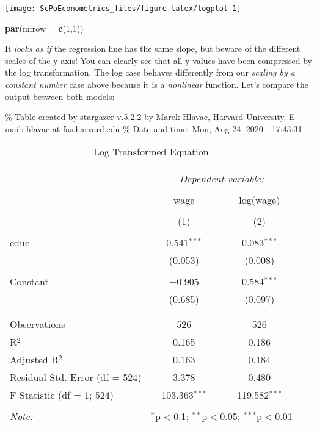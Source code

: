 \documentclass[]{book}
\newenvironment{Shaded}{\begin{snugshade}}{\end{snugshade}}
\newcommand{\DataTypeTok}[1]{\textcolor[rgb]{0.13,0.29,0.53}{#1}}
\newcommand{\DecValTok}[1]{\textcolor[rgb]{0.00,0.00,0.81}{#1}}
\newcommand{\KeywordTok}[1]{\textcolor[rgb]{0.13,0.29,0.53}{\textbf{#1}}}
\newcommand{\NormalTok}[1]{#1}
\begin{document}
\begin{center}\texttt{[image: ScPoEconometrics\_files/figure-latex/logplot-1]} \end{center}

\begin{Shaded}
\begin{Highlighting}[]
\KeywordTok{par}\NormalTok{(}\DataTypeTok{mfrow =} \KeywordTok{c}\NormalTok{(}\DecValTok{1}\NormalTok{,}\DecValTok{1}\NormalTok{))}
\end{Highlighting}
\end{Shaded}

It \emph{looks as if} the regression line has the same slope, but beware of the different scales of the y-axis! You can clearly see that all y-values have been compressed by the log transformation. The log case behaves differently from our \emph{scaling by a constant number} case above because it is a \emph{nonlinear} function. Let's compare the output between both models:

\% Table created by stargazer v.5.2.2 by Marek Hlavac, Harvard University. E-mail: hlavac at fas.harvard.edu
\% Date and time: Mon, Aug 24, 2020 - 17:43:31

\begin{table}[!htbp] \centering 
  \caption{Log Transformed Equation} 
  \label{} 
\begin{tabular}{@{\extracolsep{5pt}}lcc} 
\\[-1.8ex]\hline 
\hline \\[-1.8ex] 
 & \multicolumn{2}{c}{\textit{Dependent variable:}} \\ 
\cline{2-3} 
\\[-1.8ex] & wage & log(wage) \\ 
\\[-1.8ex] & (1) & (2)\\ 
\hline \\[-1.8ex] 
 educ & 0.541$^{***}$ & 0.083$^{***}$ \\ 
  & (0.053) & (0.008) \\ 
  & & \\ 
 Constant & $-$0.905 & 0.584$^{***}$ \\ 
  & (0.685) & (0.097) \\ 
  & & \\ 
\hline \\[-1.8ex] 
Observations & 526 & 526 \\ 
R$^{2}$ & 0.165 & 0.186 \\ 
Adjusted R$^{2}$ & 0.163 & 0.184 \\ 
Residual Std. Error (df = 524) & 3.378 & 0.480 \\ 
F Statistic (df = 1; 524) & 103.363$^{***}$ & 119.582$^{***}$ \\ 
\hline 
\hline \\[-1.8ex] 
\textit{Note:}  & \multicolumn{2}{r}{$^{*}$p$<$0.1; $^{**}$p$<$0.05; $^{***}$p$<$0.01} \\ 
\end{tabular} 
\end{table}
\end{document}
